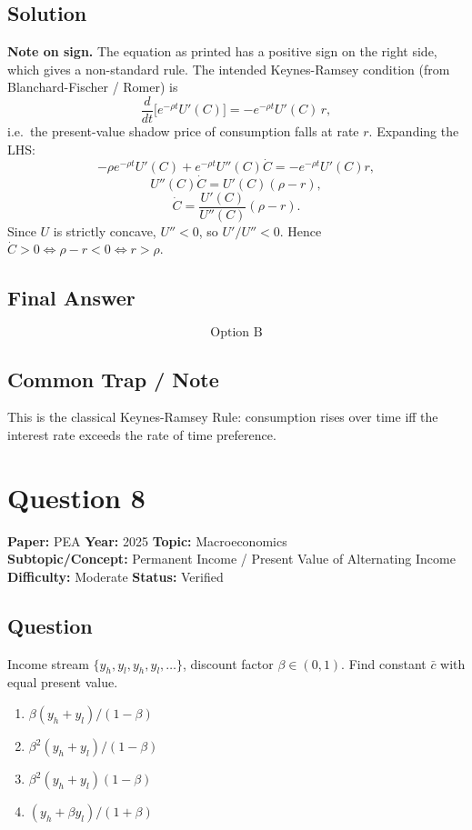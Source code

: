 \documentclass[11pt]{article}
\begin{document}
\subsection*{Solution}
\textbf{Note on sign.} The equation as printed has a positive sign on the right side, which gives a non-standard rule. The intended Keynes-Ramsey condition (from Blanchard-Fischer / Romer) is
\[
\frac{d}{dt}\bigl[e^{-\rho t}U'(C)\bigr] = -e^{-\rho t}U'(C)\, r,
\]
i.e.\ the present-value shadow price of consumption falls at rate $r$. Expanding the LHS:
\[
-\rho e^{-\rho t}U'(C) + e^{-\rho t} U''(C)\dot C = -e^{-\rho t} U'(C) r,
\]
\[
U''(C)\dot C = U'(C)(\rho - r),
\]
\[
\dot C = \frac{U'(C)}{U''(C)}(\rho - r).
\]
Since $U$ is strictly concave, $U''<0$, so $U'/U'' < 0$. Hence $\dot C > 0 \iff \rho - r < 0 \iff r > \rho$.

\subsection*{Final Answer}
\[
\boxed{\text{Option B}}
\]

\subsection*{Common Trap / Note}
This is the classical Keynes-Ramsey Rule: consumption rises over time iff the interest rate exceeds the rate of time preference.

\section*{Question 8}
\textbf{Paper:} PEA \quad \textbf{Year:} 2025 \quad \textbf{Topic:} Macroeconomics \\
\textbf{Subtopic/Concept:} Permanent Income / Present Value of Alternating Income \\
\textbf{Difficulty:} Moderate \quad \textbf{Status:} Verified

\subsection*{Question}
Income stream $\{y_h, y_l, y_h, y_l, \ldots\}$, discount factor $\beta\in(0,1)$. Find constant $\bar c$ with equal present value.
\begin{enumerate}[label=(\Alph*)]
\item $\beta(y_h + y_l)/(1-\beta)$
\item $\beta^2(y_h+y_l)/(1-\beta)$
\item $\beta^2(y_h+y_l)(1-\beta)$
\item $(y_h + \beta y_l)/(1+\beta)$
\end{enumerate}
\end{document}
